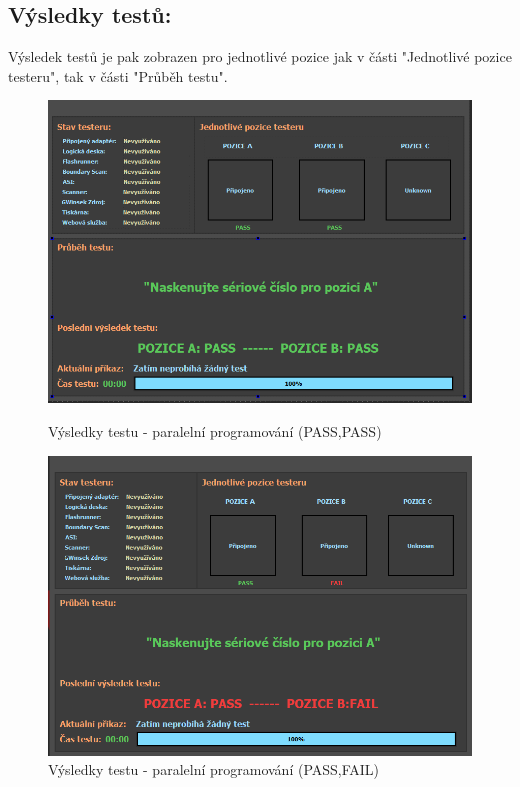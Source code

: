 \subsection{Výsledky testů:}
Výsledek testů je pak zobrazen pro jednotlivé pozice jak v části "Jednotlivé pozice testeru", tak v části "Průběh testu".
	\begin{figure}[ht!]
        \begin{minipage}{0.49\textwidth}
        \centering
		\includegraphics[height = 0.22\textheight]{obrazky/dual_SCAN_PASS.PNG}
        \caption{Výsledky testu - paralelní programování (PASS,PASS)}
        \end{minipage}
        \hfill
        \begin{minipage}{0.49\textwidth}
            \centering
            \includegraphics[height = 0.22\textheight]{obrazky/dual_SCAN_FAIL.PNG}
            \caption{Výsledky testu - paralelní programování (PASS,FAIL)}
            \end{minipage}
	\end{figure}


